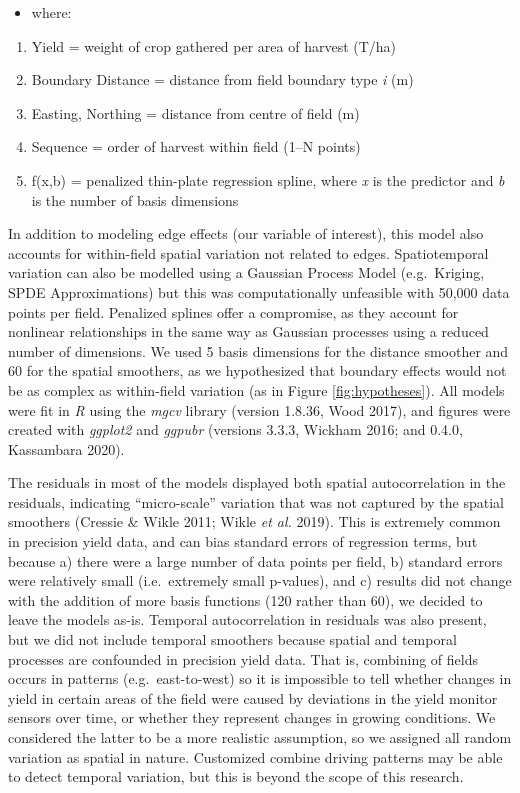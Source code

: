 \documentclass[]{elsarticle} %
\providecommand{\tightlist}{%
  \setlength{\itemsep}{0pt}\setlength{\parskip}{0pt}}
\begin{document}
\begin{itemize}
\tightlist
\item
  where:
\end{itemize}

\begin{enumerate}
\def\labelenumi{\arabic{enumi}.}
\tightlist
\item
  Yield = weight of crop gathered per area of harvest (T/ha)
\item
  Boundary Distance = distance from field boundary type \emph{i} (m)
\item
  Easting, Northing = distance from centre of field (m)
\item
  Sequence = order of harvest within field (1--N points)
\item
  f(x,b) = penalized thin-plate regression spline, where \emph{x} is the predictor and \emph{b} is the number of basis dimensions
\end{enumerate}

In addition to modeling edge effects (our variable of interest), this model also accounts for within-field spatial variation not related to edges.
Spatiotemporal variation can also be modelled using a Gaussian Process Model (e.g.~Kriging, SPDE Approximations) but this was computationally unfeasible with 50,000 data points per field.
Penalized splines offer a compromise, as they account for nonlinear relationships in the same way as Gaussian processes using a reduced number of dimensions.
We used 5 basis dimensions for the distance smoother and 60 for the spatial smoothers, as we hypothesized that boundary effects would not be as complex as within-field variation (as in Figure \ref{fig:hypotheses}).
All models were fit in \emph{R} using the \emph{mgcv} library (version 1.8.36, Wood 2017), and figures were created with \emph{ggplot2} and \emph{ggpubr} (versions 3.3.3, Wickham 2016; and 0.4.0, Kassambara 2020).

The residuals in most of the models displayed both spatial autocorrelation in the residuals, indicating ``micro-scale'' variation that was not captured by the spatial smoothers (Cressie \& Wikle 2011; Wikle \emph{et al.} 2019).
This is extremely common in precision yield data, and can bias standard errors of regression terms, but because a) there were a large number of data points per field, b) standard errors were relatively small (i.e.~extremely small p-values), and c) results did not change with the addition of more basis functions (120 rather than 60), we decided to leave the models as-is.
Temporal autocorrelation in residuals was also present, but we did not include temporal smoothers because spatial and temporal processes are confounded in precision yield data.
That is, combining of fields occurs in patterns (e.g.~east-to-west) so it is impossible to tell whether changes in yield in certain areas of the field were caused by deviations in the yield monitor sensors over time, or whether they represent changes in growing conditions.
We considered the latter to be a more realistic assumption, so we assigned all random variation as spatial in nature.
Customized combine driving patterns may be able to detect temporal variation, but this is beyond the scope of this research.
\end{document}
